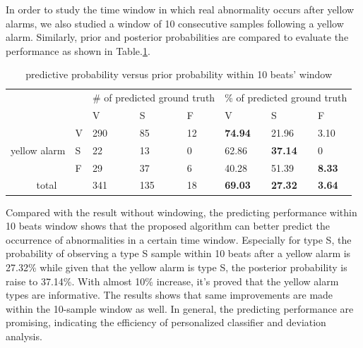 In order to study the time window in which real abnormality occurs after yellow alarms, we also studied a window of 10 consecutive samples following a yellow alarm. Similarly, prior and posterior probabilities are compared to evaluate the performance as shown in Table.\ref{table:pred10}. 


\begin{table}[t]
\centering
\caption{predictive probability versus prior probability within 10 beats' window}
\label{table:pred10}
\begin{tabular}{|c|l|l|l|l||l|l|l|}
\hline
\multicolumn{2}{|l|}{\multirow{2}{*}{}} & \multicolumn{3}{l|}{\# of predicted ground truth} & \multicolumn{3}{l|}{\% of predicted ground truth} \\ \cline{3-8} 
\multicolumn{2}{|l|}{}                  & V               & S               & F             & V               & S               & F             \\ \hline
\multirow{3}{*}{yellow alarm}    & V    & 290             & 85              & 12            & \textbf{74.94}  & 21.96           & 3.10          \\ \cline{2-8} 
                                 & S    & 22              & 13              & 0             & 62.86           & \textbf{37.14}  & 0             \\ \cline{2-8} 
                                 & F    & 29              & 37              & 6             & 40.28           & 51.39           & \textbf{8.33} \\ \hline
\multicolumn{2}{|c|}{total}             & 341             & 135             & 18            & \textbf{69.03}  & \textbf{27.32}  & \textbf{3.64} \\ \hline
\end{tabular}
\end{table}

Compared with the result without windowing, the predicting performance within 10 beats window shows that the proposed algorithm can better predict the occurrence of abnormalities in a certain time window. Especially for type S, the probability of observing a type S sample within 10 beats after a yellow alarm is 27.32\% while given that the yellow alarm is type S, the posterior probability is raise to 37.14\%. With almost 10\% increase, it's proved that the yellow alarm types are informative. The results shows that same improvements are made within the 10-sample window as well. In general, the predicting performance are promising, indicating the efficiency of personalized classifier and deviation analysis.
